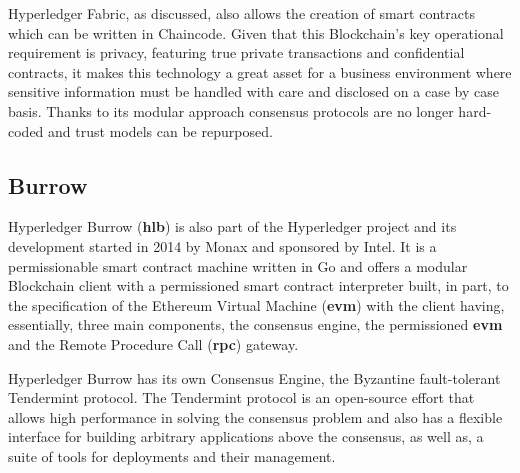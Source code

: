  Hyperledger Fabric, as discussed, also allows the creation of smart contracts
  which can be written in Chaincode.  Given that this Blockchain's key
  operational requirement is privacy, featuring true private transactions and
  confidential contracts, it makes this technology a great asset for a business
  environment where sensitive information must be handled with care and
  disclosed on a case by case basis.  Thanks to its modular approach consensus
  protocols are no longer hard-coded and trust models can be repurposed.

  \subsection{Burrow}

  Hyperledger Burrow (\textbf{hlb}) is also part of the Hyperledger project and
  its development started in 2014 by Monax and sponsored by Intel. It is a
  permissionable smart contract machine written in Go and offers a modular
  Blockchain client with a permissioned smart contract interpreter built, in
  part, to the specification of the Ethereum Virtual Machine (\textbf{evm})
  with the client having, essentially, three main components, the consensus
  engine, the permissioned \textbf{evm} and the Remote Procedure Call
  (\textbf{rpc}) gateway.  \cite{Kuhlman2017,HyperledgerBurrow2017}

  Hyperledger Burrow has its own Consensus Engine, the Byzantine fault-tolerant
  Tendermint protocol.  The Tendermint protocol is an open-source effort that
  allows high performance in solving the consensus problem and also has a
  flexible interface for building arbitrary applications above the consensus,
  as well as, a suite of tools for deployments and their management.
  \cite{Buchman2016}
